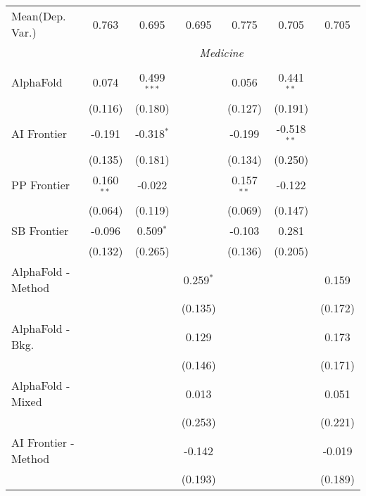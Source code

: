 \begin{tabular}{lcccccc}
Mean(Dep. Var.) & 0.763 & 0.695 & 0.695 & 0.775 & 0.705 & 0.705 \\
 & \multicolumn{6}{c}{\textit{Medicine}} \\ \\
   AlphaFold            & 0.074        & 0.499$^{***}$ &             & 0.056        & 0.441$^{**}$  &   \\   
                        & (0.116)      & (0.180)       &             & (0.127)      & (0.191)       &   \\   
   AI Frontier          & -0.191       & -0.318$^{*}$  &             & -0.199       & -0.518$^{**}$ &   \\   
                        & (0.135)      & (0.181)       &             & (0.134)      & (0.250)       &   \\   
   PP Frontier          & 0.160$^{**}$ & -0.022        &             & 0.157$^{**}$ & -0.122        &   \\   
                        & (0.064)      & (0.119)       &             & (0.069)      & (0.147)       &   \\   
   SB Frontier          & -0.096       & 0.509$^{*}$   &             & -0.103       & 0.281         &   \\   
                        & (0.132)      & (0.265)       &             & (0.136)      & (0.205)       &   \\   
   AlphaFold - Method   &              &               & 0.259$^{*}$ &              &               & 0.159\\   
                        &              &               & (0.135)     &              &               & (0.172)\\   
   AlphaFold - Bkg.     &              &               & 0.129       &              &               & 0.173\\   
                        &              &               & (0.146)     &              &               & (0.171)\\   
   AlphaFold - Mixed    &              &               & 0.013       &              &               & 0.051\\   
                        &              &               & (0.253)     &              &               & (0.221)\\   
   AI Frontier - Method &              &               & -0.142      &              &               & -0.019\\   
                        &              &               & (0.193)     &              &               & (0.189)\\   

\end{tabular}
